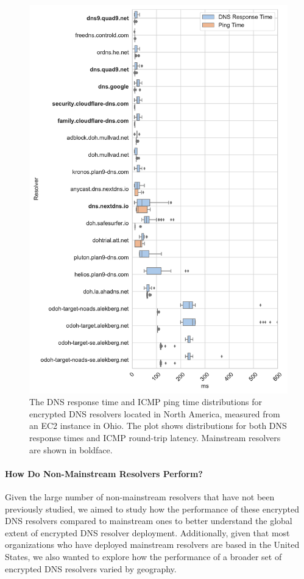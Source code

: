 \begin{figure}[t!]
\centering\includegraphics[width=0.8\columnwidth]{figures/ohio_NA.pdf}
\caption{The DNS response time and ICMP ping time distributions for
    encrypted DNS resolvers located in North America, measured from an EC2
    instance in Ohio.  The plot shows distributions for both DNS response times
    and ICMP round-trip latency. Mainstream resolvers are shown in boldface.}
    \label{fig:dns-us-ohio}
\end{figure}


\paragraph{How Do Non-Mainstream Resolvers Perform?}
Given the large number of non-mainstream resolvers that have not been
previously studied, we aimed to study how
the performance of these encrypted DNS resolvers compared to mainstream ones to better
understand the global extent of encrypted DNS resolver deployment. Additionally,
given that most organizations who have deployed mainstream resolvers are based
in the United States, we also wanted to explore how the performance of a
broader set of encrypted DNS resolvers varied by geography.

